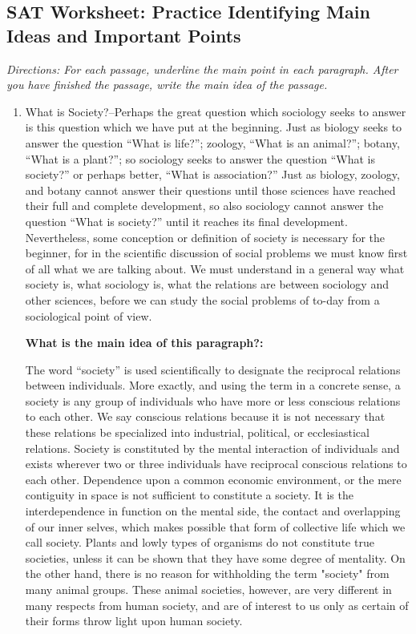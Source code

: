 \subsection{SAT Worksheet: Practice Identifying Main Ideas and Important Points}

\textit{Directions: For each passage, underline the main point in each paragraph. After you have finished the passage, write the main idea of the passage.}

\begin{enumerate}
\item 
\begin{linenumbers}
\modulolinenumbers[5]
\indent What is Society?--Perhaps the great question which sociology seeks to answer is this question which we have put at the beginning. Just as biology seeks to answer the question ``What is life?''; zoology, ``What is an animal?''; botany, ``What is a plant?''; so sociology seeks to answer the question ``What is society?'' or perhaps better, ``What is association?'' Just as biology, zoology, and botany cannot answer their questions until those sciences have reached their full and complete development, so also sociology cannot answer the question ``What is society?'' until it reaches its final development. Nevertheless, some conception or definition of society is necessary for the beginner, for in the scientific discussion of social problems we must know first of all what we are talking about. We must understand in a general way what society is, what sociology is, what the relations are between sociology and other sciences, before we can study the social problems of to-day from a sociological point of view.

\textbf{What is the main idea of this paragraph?:} \hrulefill

\hrulefill

\indent The word ``society'' is used scientifically to designate the reciprocal relations between individuals. More exactly, and using the term in a concrete sense, a society is any group of individuals who have more or less conscious relations to each other. We say conscious relations because it is not necessary that these relations be specialized into industrial, political, or ecclesiastical relations. Society is constituted by the mental interaction of individuals and exists wherever two or three individuals have reciprocal conscious relations to each other. Dependence upon a common economic environment, or the mere contiguity in space is not sufficient to constitute a society. It is the interdependence in function on the mental side, the contact and overlapping of our inner selves, which makes possible that form of collective life which we call society. Plants and lowly types of organisms do not constitute true societies, unless it can be shown that they have some degree of mentality. On the other hand, there is no reason for withholding the term "society" from many animal groups. These animal societies, however, are very different in many respects from human society, and are of interest to us only as certain of their forms throw light upon human society.


\end{linenumbers}
\end{enumerate}
